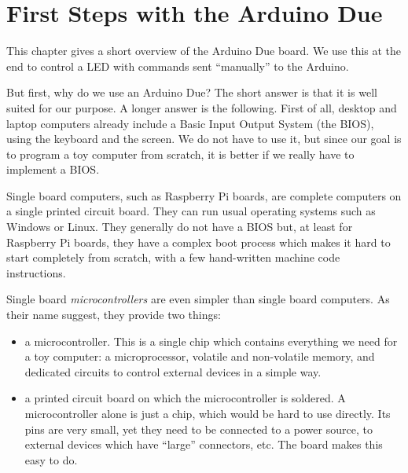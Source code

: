 
\renewcommand{\rustfile}{chapter1}
\setcounter{rustid}{0}

\chapter{First Steps with the Arduino Due}\label{chapter:arduino-due}

This chapter gives a short overview of the Arduino Due board. We use this at
the end to control a LED with commands sent ``manually'' to the Arduino.

But first, why do we use an Arduino Due? The short answer is that it is well
suited for our purpose. A longer answer is the following. First of all, desktop
and laptop computers already include a Basic Input Output System (the BIOS),
using the keyboard and the screen. We do not have to use it, but since our goal
is to program a toy computer from scratch, it is better if we really have to
implement a BIOS.

Single board computers, such as Raspberry Pi boards, are complete computers on
a single printed circuit board. They can run usual operating systems such as
Windows or Linux. They generally do not have a BIOS but, at least for Raspberry
Pi boards, they have a complex boot process which makes it hard to start
completely from scratch, with a few hand-written machine code instructions.

Single board {\em microcontrollers} are even simpler than single board
computers. As their name suggest, they provide two things:
\begin{itemize}
  \item a microcontroller. This is a single chip which contains everything we
  need for a toy computer: a microprocessor, volatile and non-volatile memory,
  and dedicated circuits to control external devices in a simple way.

  \item a printed circuit board on which the microcontroller is soldered. A
  microcontroller alone is just a chip, which would be hard to use directly.
  Its pins are very small, yet they need to be connected to a power source, to
  external devices which have ``large'' connectors, etc. The board makes this
  easy to do.
\end{itemize}

